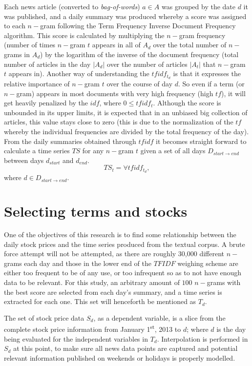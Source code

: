 \documentclass{article}
\begin{document}
\par
Each news article (converted to \textit{bag-of-words}) \(a \in A\) was grouped by the date \(d\) it was published, and a daily summary was produced whereby a score was assigned to each \(n-\)gram following the Term Frequency Inverse Document Frequency algorithm. This score is calculated by multiplying the \(n-\)gram frequency (number of times \(n-\)gram \(t\) appears in all of \(A_d\) over the total number of \(n-\)grams in \(A_d\)) by the logarithm of the inverse of the document frequency (total number of articles in the day \(\vert A_d \vert\) over the number of articles \(\vert A_t \vert\) that \(n-\)gram \(t\) appears in). Another way of understanding the \(tfidf_{t_d}\) is that it expresses the relative importance of \(n-\)gram \(t\) over the course of day \(d\). So even if a term (or \(n-\)gram) appears in most documents with very high frequency (high \(tf\)), it will get heavily penalized by the \(idf\), where \(0 \leq tfidf_t\). Although the score is unbounded in its upper limits, it is expected that in an unbiased big collection of articles, this value stays close to zero (this is due to the normalization of the \(tf\) whereby the individual frequencies are divided by the total frequency of the day).
From the daily summaries obtained through \(tfidf\) it becomes straight forward to calculate a time series \(TS\) for any \(n-\)gram \(t\) given a set of all days \(D_{start \to end}\) between days \(d_{start}\) and \(d_{end}\).
\[TS_t=\forall{tfidf_{t_d}},\] where \(d \in D_{start \to end}\).

\section{Selecting terms and stocks}
One of the objectives of this research is to find some relationship between the daily stock prices and the time series produced from the textual corpus. A brute force attempt will not be attempted, as there are roughly 30,000 different \(n-\)grams each day and those in the lower end of the \(TFIDF\) weighing scheme are either too frequent to be of any use, or too infrequent so as to not have enough data to be relevant. For this study, an arbitrary amount of \(100\) \(n-\)grams with the best score are selected from each day's summary, and a time series is extracted for each one. This set will henceforth be mentioned as \(T_d\).

\par
The set of stock price data \(S_d\), as a dependent variable, is a slice from the complete stock price information from January 1\textsuperscript{st}, 2013 to \(d\); where \(d\) is the day being evaluated for the independent variables in \(T_d\). Interpolation is performed in \(S_d\) at this point, to make sure all news data points are captured and potential relevant information published on weekends or holidays is properly modelled.
\end{document}
